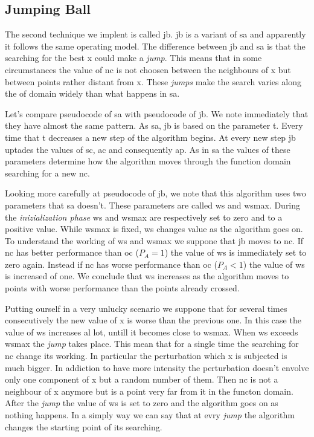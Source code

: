 \documentclass[journal]{IEEEtran}
\begin{document}
\subsection{Jumping Ball}

The second technique we implent is called \gls{jb}. \gls{jb} is a variant of \gls{sa} and apparently it follows the same operating model. The difference between \gls{jb} and \gls{sa} is that the searching for the best \gls{x} could make a \textit{jump}. This means that in some circumstances the value of \gls{nc} is not choosen between the neighbours of \gls{x} but between points rather distant from \gls{x}. These \textit{jumps} make the search  varies along the \gls{of} domain widely than what happens in \gls{sa}.

Let's compare pseudocode of \gls{sa} with pseudocode of \gls{jb}. We note immediately that they have almost the same pattern. As \gls{sa}, \gls{jb} is based on the parameter \gls{t}. Every time that \gls{t} decreases a new step of the algorithm begins. At every new step \gls{jb} uptades the values of \gls{sc}, \gls{ac} and consequently \gls{ap}. As in \gls{sa} the values of these parameters determine how the algorithm moves through the function domain searching for a new \gls{nc}.

Looking more carefully at pseudocode of \gls{jb}, we note that this algorithm uses two parameters that \gls{sa} doesn't. These parameters are called \gls{ws} and \gls{wsmax}. During the \textit{inizialization phase}  \gls{ws} and \gls{wsmax} are respectively set to zero and to a positive value. While \gls{wsmax} is fixed, \gls{ws} changes value as the algorithm goes on. To understand the working of \gls{ws} and \gls{wsmax} we suppone that \gls{jb} moves to \gls{nc}. If \gls{nc} has better performance than \gls{oc} ($P_A=1$) the value of \gls{ws} is immediately set to zero again. Instead if \gls{nc} has worse performance than \gls{oc} ($P_A<1$) the value of \gls{ws} is increased of one. We conclude that \gls{ws} increases as the algorithm moves to points with worse performance than the points already crossed.

Putting ourself in a very unlucky scenario we suppone that for several times consecutively the new value of \gls{x} is worse than the previous one. In this case the value of \gls{ws} increases al lot, untill it becomes close to \gls{wsmax}. When \gls{ws} exceeds \gls{wsmax} the \textit{jump} takes place. This mean that for a single time the searching for \gls{nc} change its working. In particular the perturbation which \gls{x} is subjected is much bigger. In addiction to have more intensity the perturbation doesn't envolve only one component of \gls{x} but a random number of them. Then \gls{nc} is not a neighbour of \gls{x} anymore but is a point very far from it in the functon domain. After the \textit{jump} the value of \gls{ws} is set to zero and the algorithm goes on as nothing happens. In a simply way we can say that at evry \textit{jump} the algorithm changes the starting point of its searching.
\end{document}
